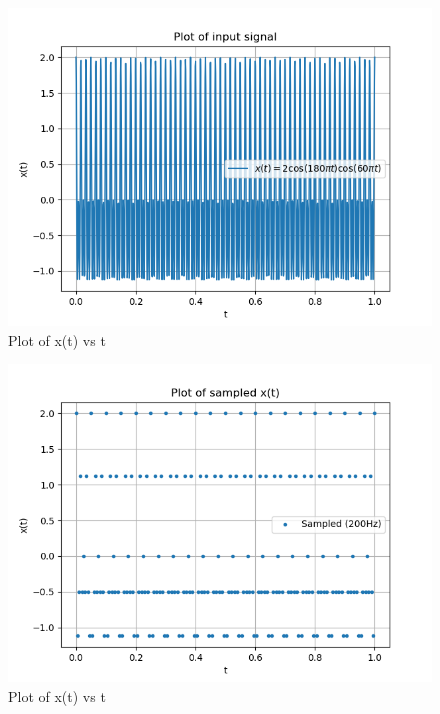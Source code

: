 \documentclass[journal,12pt,twocolumn]{IEEEtran}
\begin{document}
\begin{figure}[ht]
	\centering
	\includegraphics[width=1\linewidth]{figs/signalplot.png}
	\caption{Plot of x(t) vs t}
\end{figure}
\begin{figure}[ht]
	\centering
	\includegraphics[width=1\linewidth]{figs/samplingplot.png}
	\caption{Plot of x(t) vs t}
\end{figure}
\end{document}
